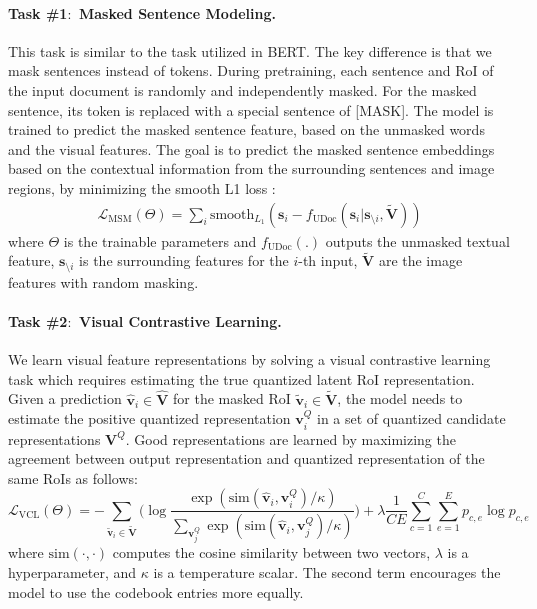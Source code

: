 \documentclass{article}
\begin{document}
	\paragraph{Task \#1$\colon$ Masked Sentence Modeling.}
	This task is similar to the  task utilized in BERT. The key difference is that we mask sentence{s} instead of tokens. During pretraining, each sentence and RoI {of} the input document is randomly {and independently} masked. For the masked sentence, its token is replaced with a special sentence of [MASK]. The model is trained to predict the masked sentence feature, based on the unmasked words and the visual features. The goal is to predict {the} masked sentence embedding{s} based on the {contextual information from} {the} surrounding sentences and image regions, by minimizing the smooth {L1} loss \cite{girshick2015fast}:
	\begin{align}
		\mathcal{L}_{\text{MSM}}(\Theta)= \sum_i \text{smooth}_{L_1} (\bm{s}_i - f_{\text{UDoc}}(\bm{s}_{i}|\bm{s}_{\setminus  i}, \mathbf{\tilde{V}}))
		\label{eq:msm}
	\end{align}
	{where $\Theta$ is the trainable parameters and $f_{\text{UDoc}}(.)$ outputs the unmasked textual feature, {$\bm{s}_{\setminus  i}$ is the surrounding features for the $i$-th input}, $\mathbf{\tilde{V}}$ are the image features with random masking.}
	
	\paragraph{Task \#2$\colon$ Visual Contrastive Learning.}
	We learn {visual feature} representations by solving a visual contrastive learning task which requires {estimating} the true quantized latent RoI representation. Given {a} {prediction} {$\bm{\hat{v}}_i\in \bm{\hat{V}}$} for the masked RoI {$\bm{\tilde{v}}_i\in\mathbf{\tilde{V}}$}, the model needs to {estimate} the positive quantized representation {$\bm{v}^Q_i$} in a set of quantized candidate representations {$\mathbf{V}^Q$}.
	{Good representations are learned} by maximizing {the} agreement between output representation and quantized representation {of the same RoIs} as follows:
	\begin{equation}
		\mathcal{L}_{\text{VCL}}(\Theta) = -\sum_{\bm{\tilde{v}}_i\in\mathbf{\tilde{V}}}\Big(\log \frac{\exp(\text{sim}(\bm{{\hat{v}}}_{i}, \bm{v}^Q_i)/\kappa)}{\sum_{\bm{v}^Q_j} \exp(\text{sim}(\bm{{\hat{v}}}_i, \bm{v}^Q_j)/\kappa)}\Big) + \lambda  \frac{1}{CE} \sum_{c=1}^{C} \sum_{e=1}^{E} p_{c,e} \log{p_{c,e}}
		\label{eq:loss}
	\end{equation}
	where $\text{sim}(\cdot, \cdot)$ {computes the} cosine similarity between two vectors, {$\lambda$} is a hyperparameter, and $\kappa$ is a temperature scalar. The second term encourages the model to use the codebook entries {more} equally. 
	
\end{document}
